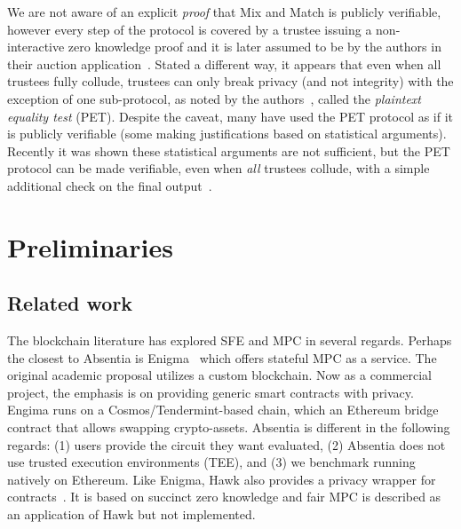 We are not aware of an explicit \emph{proof} that Mix and Match is publicly verifiable, however every step of the protocol is covered by a trustee issuing a non-interactive zero knowledge proof and it is later assumed to be by the authors in their auction application~\cite{JJ00}. Stated a different way, it appears that even when all trustees fully collude, trustees can only break privacy (and not integrity) with the exception of one sub-protocol, as noted by the authors~\cite{JJ00}, called the \emph{plaintext equality test} (PET). Despite the caveat, many have used the PET protocol as if it is publicly verifiable (some making justifications based on statistical arguments). Recently it was shown these statistical arguments are not sufficient, but the PET protocol can be made verifiable, even when \emph{all} trustees collude, with a simple additional check on the final output~\cite{mcmurtry2020test}.


\section{Preliminaries}


\subsection{Related work}
\label{sec:lit}

The blockchain literature has explored SFE and MPC in several regards. Perhaps the closest to Absentia is Enigma~\cite{zyskind2015decentralizing} which offers stateful MPC as a service. The original academic proposal utilizes a custom blockchain. Now as a commercial project, the emphasis is on providing generic smart contracts with privacy. Engima runs on a Cosmos/Tendermint-based chain, which an Ethereum bridge contract that allows swapping crypto-assets. Absentia is different in the following regards: (1) users provide the circuit they want evaluated, (2) Absentia does not use trusted execution environments (TEE), and (3) we benchmark running natively on Ethereum. Like Enigma, Hawk also provides a privacy wrapper for contracts~\cite{kosba2016hawk}. It is based on succinct zero knowledge and fair MPC is described as an application of Hawk but not implemented.  


